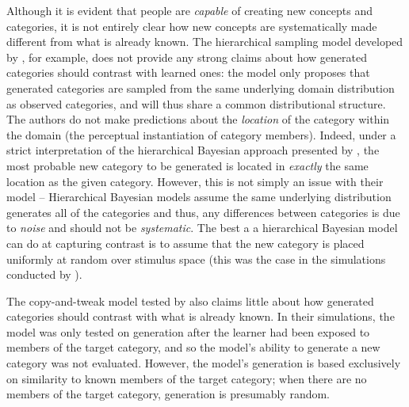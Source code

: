 \documentclass[12pt]{article}
\newcommand\jlanote[1]{\todo[inline, backgroundcolor = lime]{\textbf{JLA}: #1}}
\begin{document}
\begin{flushleft}
Although it is evident that people are \textit{capable} of creating new concepts and categories, it is not entirely clear how new concepts are systematically made different from what is already known. The hierarchical sampling model developed by \cite{jern2013probabilistic}, for example, does not provide any strong claims about how generated categories should contrast with learned ones: the model only proposes that generated categories are sampled from the same underlying domain distribution as observed categories, and will thus share a common distributional structure. The authors do not make predictions about the \textit{location} of the category within the domain (the perceptual instantiation of category members). Indeed, under a strict interpretation of the hierarchical Bayesian approach presented by \citeauthor{jern2013probabilistic}, the most probable new category to be generated is located in {\em exactly} the same location as the given category. However, this is not simply an issue with their model -- Hierarchical Bayesian models assume the same underlying distribution generates all of the categories and thus, any differences between categories is due to {\em noise} and should not be {\em systematic}. The best a a hierarchical Bayesian model can do at capturing contrast is to assume that the new category is placed uniformly at random over stimulus space (this was the case in the simulations conducted by \citeauthor{jern2013probabilistic}).


The copy-and-tweak model tested by \cite{jern2013probabilistic} also claims little about how generated categories should contrast with what is already known. In their simulations, the model was only tested on generation after the learner had been exposed to members of the target category, and so the model's ability to generate a new category was not evaluated. However, the model's generation is based exclusively on similarity to known members of the target category; when there are no members of the target category, generation is presumably random.






\end{flushleft}
\end{document}
